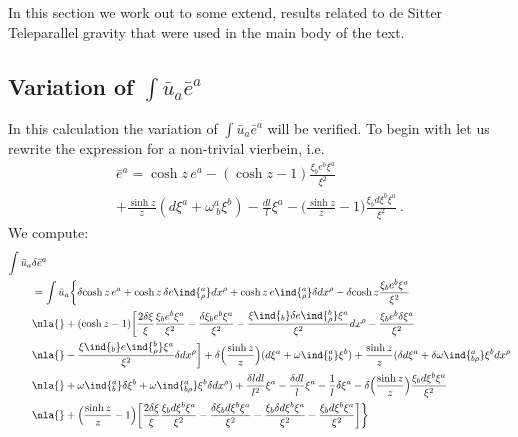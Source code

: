 \documentclass[11pt]{article}
\begin{document}
In this section we work out to some extend, results related to de 
Sitter Teleparallel gravity that were used in the main body of 
the text.

\subsection{Variation of $\int \bar{u}_a \bar{e}^a$}
\label{ssec:dSTG_var_ue}

In this calculation the variation of $\int \bar{u}_a \bar{e}^a$ 
will be verified.  To begin with let us rewrite the expression 
for a non-trivial vierbein, i.e.
\begin{multline*}
	\bar{e}^a = \cosh z\, e^a - (\cosh z -1) \frac{\xi_b e^b 
		\xi^a}{\xi^2} \\
		+ \frac{\sinh z}{z}(d\xi^a + \omega^a_{~b}\xi^b) - 
		\frac{dl}{l} \xi^a - \bigg( \frac{\sinh z}{z} - 1 \bigg) 
		\frac{\xi_b d\xi^b \xi^a}{\xi^2}~.
\end{multline*}
We compute:
\begin{displaymath}
\begin{split}
	\int \bar{u}_a &\delta\bar{e}^a \\
	&= \int \bar{u}_a \bigg\{ \delta\!\cosh z\, e^a + \cosh z\, 
	\delta e\ind{^a_\rho} dx^\rho + \cosh z\, e\ind{^a_\rho} 
	\delta dx^\rho - \delta\!\cosh z \frac{\xi_b e^b \xi^a}{\xi^2} 
	\\
	&\nla{} + (\cosh z - 1) \bigg[ \frac{2\delta\xi}{\xi} 
	\frac{\xi_b e^b \xi^a}{\xi^2} - \frac{\delta\xi_b e^b 
		\xi^a}{\xi^2} -\frac{\xi\ind{_b} \delta e\ind{^b_\rho} 
		\xi^a}{\xi^2} dx^\rho - \frac{\xi_b e^b \delta\xi^a}{\xi^2} 
	\\
	&\nla{} - \frac{\xi\ind{_b} e\ind{^b_\rho} \xi^a}{\xi^2} 
	\delta dx^\rho \bigg] + \delta \Big( \frac{\sinh z}{z} \Big) ( 
	d\xi^a + \omega\ind{^a_b}\xi^b )
	+ \frac{\sinh z}{z} (\delta d\xi^a + \delta 
	\omega\ind{^a_{b\rho}} \xi^b dx^\rho
	\\
	&\nla{} + \omega\ind{^a_b} \delta\xi^b + 
	\omega\ind{^a_{b\rho}} \xi^b \delta dx^\rho) + \frac{\delta l 
		dl}{l^2} \xi^a - \frac{\delta dl}{l} \xi^a - 
	\frac{1}{l}\delta\xi^a - \delta \Big( \frac{\sinh z}{z} \Big) 
	\frac{\xi_b d\xi^b \xi^a}{\xi^2}
	\\
	&\nla{} + \Big( \frac{\sinh z}{z} -1 \Big) \bigg[ 
	\frac{2\delta\xi}{\xi} \frac{\xi_b d\xi^b \xi^a}{\xi^2} - 
	\frac{\delta\xi_b d\xi^b \xi^a}{\xi^2} - \frac{\xi_b \delta 
		d\xi^b \xi^a}{\xi^2} - \frac{\xi_b d\xi^b \xi^a}{\xi^2} 
	\bigg]\bigg\}
\end{split}
\end{displaymath}
\end{document}
